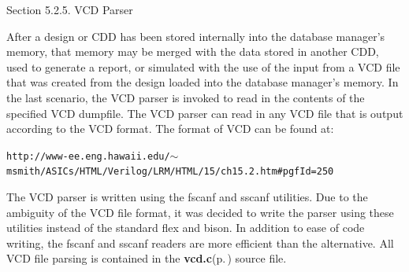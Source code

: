 \begin{Desc}
\item[Section 5.2.5. VCD Parser]\end{Desc}
\begin{Desc}
\item[]After a design or CDD has been stored internally into the database manager's memory, that memory may be merged with the data stored in another CDD, used to generate a report, or simulated with the use of the input from a VCD file that was created from the design loaded into the database manager's memory. In the last scenario, the VCD parser is invoked to read in the contents of the specified VCD dumpfile. The VCD parser can read in any VCD file that is output according to the VCD format. The format of VCD can be found at:\end{Desc}
\begin{Desc}
\item[]{\tt http://www-ee.eng.hawaii.edu/$\sim$msmith/ASICs/HTML/Verilog/LRM/HTML/15/ch15.2.htm\#pgf\-Id=250}\end{Desc}
\begin{Desc}
\item[]The VCD parser is written using the fscanf and sscanf utilities. Due to the ambiguity of the VCD file format, it was decided to write the parser using these utilities instead of the standard flex and bison. In addition to ease of code writing, the fscanf and sscanf readers are more efficient than the alternative. All VCD file parsing is contained in the {\bf vcd.c}{\rm (p.\,\pageref{vcd_8c})} source file.\end{Desc}




